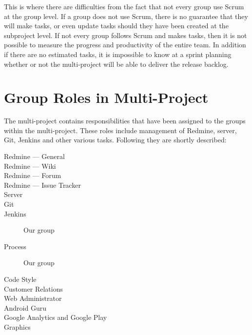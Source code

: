 This is where there are difficulties from the fact that not every group use Scrum at the group level. If a group does not use Scrum, there is no guarantee that they will make tasks, or even update tasks should they have been created at the subproject level. If not every group follows Scrum and makes tasks, then it is not possible to measure the progress and productivity of the entire team. In addition if there are no estimated tasks, it is impossible to know at a sprint planning whether or not the multi-project will be able to deliver the release backlog.

\section{Group Roles in Multi-Project}\label{sec:multi_project_group_roles}

The multi-project contains responsibilities that have been assigned to the groups within the multi-project. These roles include management of Redmine, server, Git, Jenkins and other various tasks. Following they are shortly described:

\begin{description}
  \item[Redmine --- General] \dummy \dummy
  \item[Redmine --- Wiki] \dummy \dummy
  \item[Redmine --- Forum] \dummy
  \item[Redmine --- Issue Tracker] \dummy \dummy
  \item[Server] \dummy \dummy
  \item[Git] \dummy \dummy
  \item[Jenkins] Our group
  \item[Process] Our group
  \item[Code Style] \dummy \dummy
  \item[Customer Relations] 
  \item[Web Administrator] \dummy \dummy
  \item[Android Guru] \dummy \dummy
  \item[Google Analytics and Google Play] \dummy \dummy
  \item[Graphics] \dummy \dummy
\end{description}